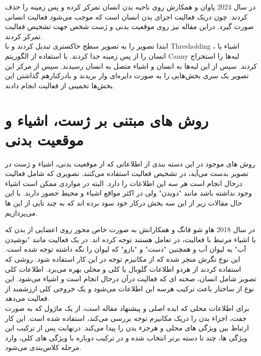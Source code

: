    در سال 2024 پاوان و همکارش %
   \cite{shape_orbicular_grid_action}
   روی ناحیه بدن انسان تمرکز کرده و پس زمینه را حذف کردند. چون دریک فعالیت اجزای بدن انسان است که موجب می‌شود فعالیت انسانی صورت گیرد. دراین مقاله نیز روی موقعیت بدنی و ژست شخص جهت تشخیص فعالیت تمرکز کردند.\\
   ابتدا تصویر را به تصویر سطح خاکستری تبدیل کردند و با %
   \gls{Thresholding}
   ، اشیاء یا انسان را از پس زمینه جدا کردند. با استفاده از الگوریتم Canny لبه‌ها را استخراج کردند. سپس از این لبه‌‌ها به انسان و اشیاء متصل به انسان رسیدند. سپس از مرکز این تصویر یک سری بخش‌هایی را به صورت دایره‌ای وار بریدند و بادرکنارهم گذاشتن این بخش‌ها تخمینی از فعالیت انجام دادند.
   
\section{روش های مبتنی بر ژست، اشیاء و موقعیت بدنی}
روش های موجود در این دسته بندی از اطلاعاتی که از موقعیت بدنی، اشیاء و ژست در تصویر بدست می‌آید، در تشخیص فعالیت استفاده می‌کنند. تصویری که شامل فعالیت درحال انجام است هر سه این اطلاعات را دارد. البته در مواردی ممکن است اشیاء وجود نداشته باشد مانند "دویدن" ولی در اکثر مواقع اشیاء و محیط حضور دارند. با این حال مقالات زیر از این سه بخش درکار خود سود برده اند که به چند تایی از این ها می‌پردازیم.

 در سال 2018 هاو شو فانگ و همکارانش %
\cite{Pairwise_bodypart_att_2018}
به صورت خاص محور روی اعضایی از بدن که با اشیاء مرتبط با فعالیت، در تعامل هستند توجه کرده اند. در یک فعالیت مانند "نوشیدن آب" به لیوان آب و همچنین "دست" و "بازو" که لیوان را نگه داشته توجه شده است. این نوع نگرش منجر شده که از مکانیزم توجه در این کار استفاده شود. روشی که استفاده کردند از هردو اطلاعات گلوبال یا کلی و محلی بهره می‌برد. اطلاعات کلی تصویر شامل انسان، صحنه ای که فعالیت درآن درحال انجام است و اشیاء می‌شود. این نوع از ساختار باعث ترکیب هرسه این اطلاعات می‌شود و یک خروجی کلی ارزشمند از فعالیت می‌دهد.\\
برای اطلاعات محلی که ایده اصلی و پیشنهاد مقاله است،‌ از یک ماژول که به صورت جفت، اجزاء بدن را دریک مکانیزم توجه بررسی می‌کند،‌ استفاده شده است. این کار ارتباط بین ویژگی های محلی و هرجزء بدن را پیدا می‌کند. درنهایت پس از ترکیب این ویژگی ها،‌ چند تا دسته برتر انتخاب شده و در ترکیب دوباره با ویژگی های کلی،‌ وارد مرحله کلاس‌بندی می‌شود.

